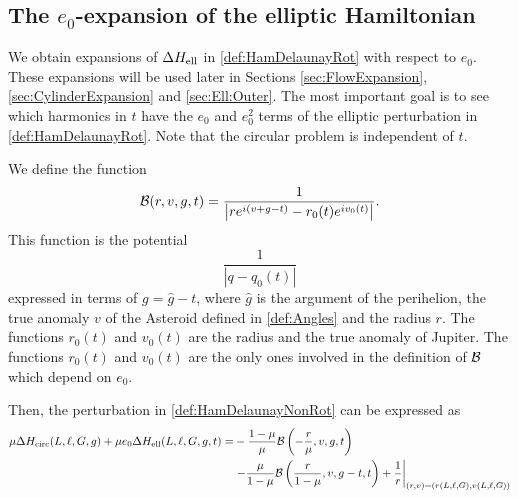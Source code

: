 
\subsection{The $e_0$-expansion of the elliptic Hamiltonian}\label{sec:Expansion:Hamiltonian}

We obtain expansions of $\Delta H_{\mathrm{ell}}$ in \eqref{def:HamDelaunayRot} with respect
to $e_0$. These expansions will be used later in Sections \ref{sec:FlowExpansion}, \ref{sec:CylinderExpansion}
and \ref{sec:Ell:Outer}. The most important goal is to see which harmonics in $t$ have
the $e_0$ and $e_0^2$ terms of the elliptic perturbation in \eqref{def:HamDelaunayRot}.
Note that the circular problem is independent of $t$.



We define the function
\begin{equation}\label{def:Potential}
  \mathcal{B}(r,v,g, t)=\frac{1}{\left|r e^{i(v+g-t)}-r_0(t) e^{iv_0(t)}\right|}.
\end{equation}
This function is the potential
\[
\frac{1}{|q-q_0(t)|}
\]
expressed in terms of  $g=\hat g-t$, where $\hat g$ is the argument of the perihelion,
the  true  anomaly $v$ of the Asteroid defined in \eqref{def:Angles} and the radius $r$.
The functions $r_0(t)$ and $v_0(t)$ are the radius and the true anomaly of Jupiter.
The functions $r_0(t)$ and $v_0(t)$ are the only ones involved in the definition of $\mathcal{B}$
which depend on $e_0$.

Then, the perturbation in \eqref{def:HamDelaunayNonRot} can be expressed as
\[
\begin{split}
  \mu\Delta H_{\mathrm{circ}}(L,\ell,G,g) +\mu e_0\Delta H_{\mathrm{ell}}(L,\ell,G,g,t)=&-\frac{1-\mu}{\mu} \mathcal{B}\left(-\frac{r}{\mu},v,g, t\right)\\
  &\left.-\frac{\mu}{1-\mu} \mathcal{B}\left(\frac{r}{1-\mu},v,g-t, t\right)+\frac{1}{r}\right|_{(r,v)=(r(L,\ell,G), v(L,\ell,G))}
\end{split}
\]



